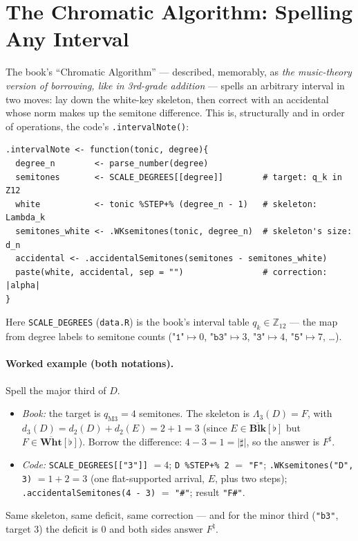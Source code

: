 \documentclass[11pt]{article}
\newcommand{\Lam}{\Lambda}                      %
\newcommand{\BL}{\overline{\textbf{Blk}}}       %
\newcommand{\WH}{\overline{\textbf{Wht}}}       %
\newcommand{\Ztwelve}{\mathbb{Z}_{12}}
\theoremstyle{definition}
\theoremstyle{remark}
\newcommand{\code}[1]{\texttt{#1}}
\newcommand{\file}[1]{\texttt{#1}}
\begin{document}
\section{The Chromatic Algorithm: Spelling Any Interval}\label{sec:chromatic}

The book's ``Chromatic Algorithm'' --- described, memorably, as \emph{the
music-theory version of borrowing, like in 3rd-grade addition} --- spells an
arbitrary interval in two moves: lay down the white-key skeleton, then correct
with an accidental whose norm makes up the semitone difference. This is,
structurally and in order of operations, the code's \code{.intervalNote()}:

\begin{lstlisting}
.intervalNote <- function(tonic, degree){
  degree_n        <- parse_number(degree)
  semitones       <- SCALE_DEGREES[[degree]]        # target: q_k in Z12
  white           <- tonic %STEP+% (degree_n - 1)   # skeleton: Lambda_k
  semitones_white <- .WKsemitones(tonic, degree_n)  # skeleton's size: d_n
  accidental <- .accidentalSemitones(semitones - semitones_white)
  paste(white, accidental, sep = "")                # correction: |alpha|
}
\end{lstlisting}

Here \code{SCALE\_DEGREES} (\file{data.R}) is the book's interval table
$q_k \in \Ztwelve$ --- the map from degree labels to semitone counts
($\code{"1"} \mapsto 0$, $\code{"b3"} \mapsto 3$, $\code{"3"} \mapsto 4$,
$\code{"5"} \mapsto 7$, \dots).

\paragraph{Worked example (both notations).} Spell the major third of $D$.
\begin{itemize}[leftmargin=2em]
  \item \emph{Book:} the target is $q_{\text{M3}} = 4$ semitones. The skeleton is
        $\Lam_3(D) = F$, with $d_3(D) = d_2(D) + d_2(E) = 2 + 1 = 3$ (since
        $E \in \BL[\flat]$ but $F \in \WH[\flat]$). Borrow the difference:
        $4 - 3 = 1 = |\sharp|$, so the answer is $F^{\sharp}$.
  \item \emph{Code:} \code{SCALE\_DEGREES[["3"]]} $= 4$;
        \code{D \%STEP+\% 2} $=$ \code{"F"};
        \code{.WKsemitones("D", 3)} $= 1 + 2 = 3$ (one flat-supported arrival,
        $E$, plus two steps);
        \code{.accidentalSemitones(4 - 3)} $=$ \code{"\#"}; result \code{"F\#"}.
\end{itemize}
Same skeleton, same deficit, same correction --- and for the minor third
(\code{"b3"}, target 3) the deficit is $0$ and both sides answer $F^{\natural}$.
\end{document}
